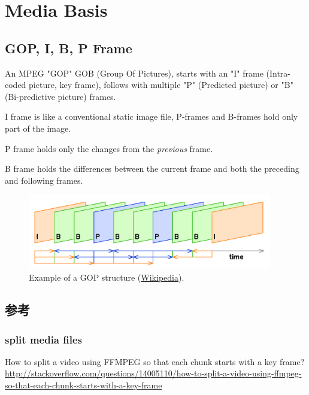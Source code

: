 \documentclass[letter,11pt,onecolumn]{book}
\title{\doctitle}
\author{\docauthor}
\begin{document}
\maketitle
\tableofcontents









\appendix

\appendix

\chapter{Media Basis}

\section{GOP, I, B, P Frame}

An MPEG "GOP" GOB (Group Of Pictures), starts with an "I" frame (Intra-coded picture, key frame),
follows with multiple "P" (Predicted picture) or "B" (Bi-predictive picture) frames.

I frame is like a conventional static image file, P-frames and B-frames hold only part of the image.

P frame holds only the changes from the \emph{previous} frame.

B frame holds the differences between the current frame and both the preceding and following frames.


\begin{figure}\centering
  \includegraphics[width=0.95\textwidth]{figures-appconv2dash/gop-ipb.png}
  \caption{Example of a GOP structure (\href{http://en.wikipedia.org/wiki/Inter_frame}{Wikipedia}).}\label{fig:gopipb}
\end{figure}

\section{参考}

\subsection{split media files}
How to split a video using FFMPEG so that each chunk starts with a key frame?
\url{http://stackoverflow.com/questions/14005110/how-to-split-a-video-using-ffmpeg-so-that-each-chunk-starts-with-a-key-frame}
\end{document}
